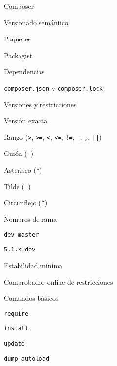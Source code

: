 \begin{longenum}
\begin{longenum}
\begin{longenum}
        \end{longenum}
        \item Composer
        \begin{longenum}
            \item Versionado semántico
            \item Paquetes
            \item Packagist
            \item Dependencias
            \begin{longenum}
                \item \texttt{composer.json} y \texttt{composer.lock}
            \end{longenum}
            \item Versiones y restricciones
            \begin{longenum}
                \item Versión exacta
                \item Rango (\texttt{>}, \texttt{>=}, \texttt{<}, \texttt{<=}, \texttt{!=}, \texttt{ }, \texttt{,}, \texttt{||})
                \item Guión (\texttt{-})
                \item Asterisco (\texttt{*})
                \item Tilde (\texttt{~})
                \item Circunflejo (\texttt{\^})
                \item Nombres de rama
                \begin{longenum}
                    \item \texttt{dev-master}
                    \item \texttt{5.1.x-dev}
                \end{longenum}
                \item Estabilidad mínima
                \item Comprobador online de restricciones
            \end{longenum}
            \item Comandos básicos
            \begin{longenum}
                \item \texttt{require}
                \item \texttt{install}
                \item \texttt{update}
                \item \texttt{dump-autoload}
            \end{longenum}

\end{longenum}
\end{longenum}
\end{longenum}
